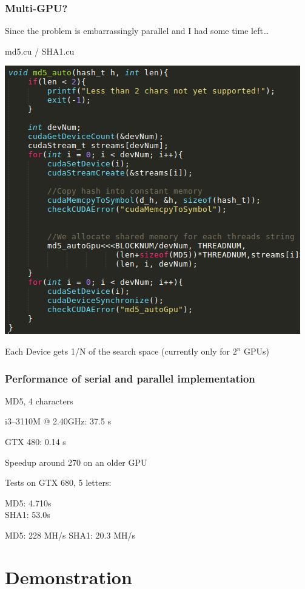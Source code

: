\documentclass{beamer}
\begin{document}
\begin{frame}
	\frametitle{Multi-GPU?}
	Since the problem is embarrassingly parallel and I had some time left\dots

	\begin{center}
		md5.cu / SHA1.cu

		\includegraphics[width=.55\textwidth]{multiGpu.png}
	\end{center}

	Each Device gets 1/N of the search space (currently only for $2^n$ GPUs)
\end{frame}


\begin{frame}
	\frametitle{Performance of serial and parallel implementation}

	MD5, 4 characters

	i3--3110M @ 2.40GHz: 37.5 s

	GTX 480: 0.14 s

	\vspace{1em}
	Speedup around 270 on an older GPU

	\vspace{2em}
	Tests on GTX 680, 5 letters:

	MD5:  4.710s\\
	SHA1: 53.0s

	\vspace{1em}
	MD5:  228  MH/s
	SHA1: 20.3 MH/s
\end{frame}


\section{Demonstration}
\end{document}
